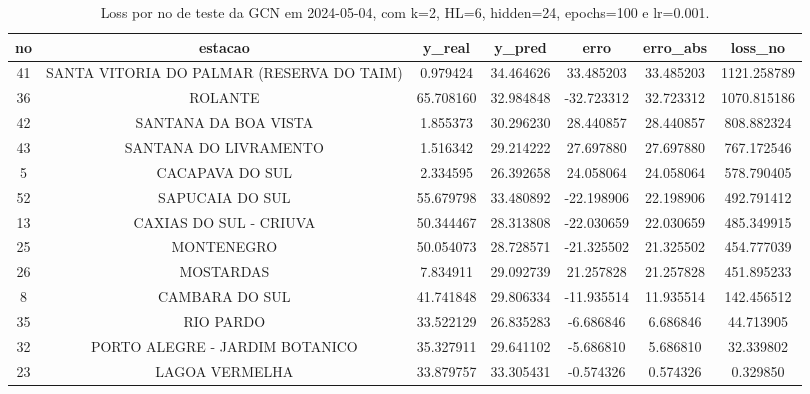 \begin{table}[h]
\centering
\caption{Loss por no de teste da GCN em 2024-05-04, com k=2, HL=6, hidden=24, epochs=100 e lr=0.001.}
\label{tab:gcn_loss_k2_hl6_h24_e100_d20240504}
\begin{tabular}{ccccccc}
\toprule
no & estacao & y\_real & y\_pred & erro & erro\_abs & loss\_no \\
\midrule
41 & SANTA VITORIA DO PALMAR (RESERVA DO TAIM) & 0.979424 & 34.464626 & 33.485203 & 33.485203 & 1121.258789 \\
36 & ROLANTE & 65.708160 & 32.984848 & -32.723312 & 32.723312 & 1070.815186 \\
42 & SANTANA DA BOA VISTA & 1.855373 & 30.296230 & 28.440857 & 28.440857 & 808.882324 \\
43 & SANTANA DO LIVRAMENTO & 1.516342 & 29.214222 & 27.697880 & 27.697880 & 767.172546 \\
5 & CACAPAVA DO SUL & 2.334595 & 26.392658 & 24.058064 & 24.058064 & 578.790405 \\
52 & SAPUCAIA DO SUL & 55.679798 & 33.480892 & -22.198906 & 22.198906 & 492.791412 \\
13 & CAXIAS DO SUL - CRIUVA & 50.344467 & 28.313808 & -22.030659 & 22.030659 & 485.349915 \\
25 & MONTENEGRO & 50.054073 & 28.728571 & -21.325502 & 21.325502 & 454.777039 \\
26 & MOSTARDAS & 7.834911 & 29.092739 & 21.257828 & 21.257828 & 451.895233 \\
8 & CAMBARA DO SUL & 41.741848 & 29.806334 & -11.935514 & 11.935514 & 142.456512 \\
35 & RIO PARDO & 33.522129 & 26.835283 & -6.686846 & 6.686846 & 44.713905 \\
32 & PORTO ALEGRE - JARDIM BOTANICO & 35.327911 & 29.641102 & -5.686810 & 5.686810 & 32.339802 \\
23 & LAGOA VERMELHA & 33.879757 & 33.305431 & -0.574326 & 0.574326 & 0.329850 \\
\bottomrule
\end{tabular}
\end{table}
